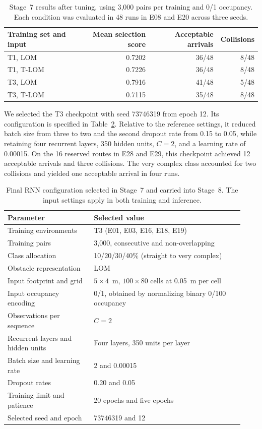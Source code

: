 \documentclass[robotics,article,submit,pdftex,moreauthors]{Definitions/mdpi}
\begin{document}
\begin{table}[htbp]
\color{red}
\centering
\caption{Stage~7 results after tuning, using 3,000 pairs per training and 0/1 occupancy. Each condition was evaluated in 48 runs in E08 and E20 across three seeds.}
\label{tab:stage7_comparison}
\small
\begin{tabular}{lrrr}
\toprule
Training set and input & Mean selection score & Acceptable arrivals & Collisions \\
\midrule
T1, LOM & 0.7202 & 36/48 & 8/48 \\
T1, T-LOM & 0.7226 & 36/48 & 8/48 \\
T3, LOM & 0.7916 & 41/48 & 5/48 \\
T3, T-LOM & 0.7115 & 35/48 & 8/48 \\
\bottomrule
\end{tabular}
\end{table}

We selected the T3 checkpoint with seed 73746319 from epoch 12. Its configuration is specified in Table~\ref{tab:final_rnn_configuration}. Relative to the reference settings, it reduced batch size from three to two and the second dropout rate from 0.15 to 0.05, while retaining four recurrent layers, 350 hidden units, $C=2$, and a learning rate of 0.00015. On the 16 reserved routes in E28 and E29, this checkpoint achieved 12 acceptable arrivals and three collisions. The very complex class accounted for two collisions and yielded one acceptable arrival in four runs.

\begin{table}[htbp]
\color{red}
\centering
\caption{Final RNN configuration selected in Stage~7 and carried into Stage~8. The input settings apply in both training and inference.}
\label{tab:final_rnn_configuration}
\small
\begin{tabular}{@{}p{0.34\linewidth}p{0.59\linewidth}@{}}
\toprule
Parameter & Selected value \\
\midrule
Training environments & T3 (E01, E03, E16, E18, E19) \\
Training pairs & 3,000, consecutive and non-overlapping \\
Class allocation & 10/20/30/40\% (straight to very complex) \\
Obstacle representation & LOM \\
Input footprint and grid & $5\times4$~m, $100\times80$ cells at 0.05~m per cell \\
Input occupancy encoding & 0/1, obtained by normalizing binary 0/100 occupancy \\
Observations per sequence & $C=2$ \\
Recurrent layers and hidden units & Four layers, 350 units per layer \\
Batch size and learning rate & 2 and 0.00015 \\
Dropout rates & 0.20 and 0.05 \\
Training limit and patience & 20 epochs and five epochs \\
Selected seed and epoch & 73746319 and 12 \\
\bottomrule
\end{tabular}
\end{table}
\end{document}
